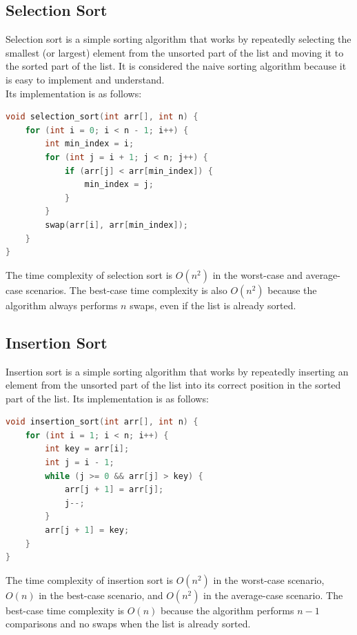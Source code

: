 \subsection{Selection Sort}

Selection sort is a simple sorting algorithm that works by repeatedly selecting
the smallest (or largest) element from the unsorted part of the list and moving
it to the sorted part of the list. It is considered the naive sorting algorithm
because it is easy to implement and understand.\\

Its implementation is as follows:

\begin{lstlisting}[language=C++]
void selection_sort(int arr[], int n) {
    for (int i = 0; i < n - 1; i++) {
        int min_index = i;
        for (int j = i + 1; j < n; j++) {
            if (arr[j] < arr[min_index]) {
                min_index = j;
            }
        }
        swap(arr[i], arr[min_index]);
    }
}
\end{lstlisting}

The time complexity of selection sort is $O(n^2)$ in the worst-case and
average-case scenarios. The best-case time complexity is also $O(n^2)$ because
the algorithm always performs $n$ swaps, even if the list is already sorted.

\subsection{Insertion Sort}

Insertion sort is a simple sorting algorithm that works by repeatedly inserting
an element from the unsorted part of the list into its correct position in the
sorted part of the list. Its implementation is as follows:

\begin{lstlisting}[language=C++]
void insertion_sort(int arr[], int n) {
    for (int i = 1; i < n; i++) {
        int key = arr[i];
        int j = i - 1;
        while (j >= 0 && arr[j] > key) {
            arr[j + 1] = arr[j];
            j--;
        }
        arr[j + 1] = key;
    }
}
\end{lstlisting}

The time complexity of insertion sort is $O(n^2)$ in the worst-case scenario,
$O(n)$ in the best-case scenario, and $O(n^2)$ in the average-case scenario.
The best-case time complexity is $O(n)$ because the algorithm performs $n - 1$
comparisons and no swaps when the list is already sorted.

